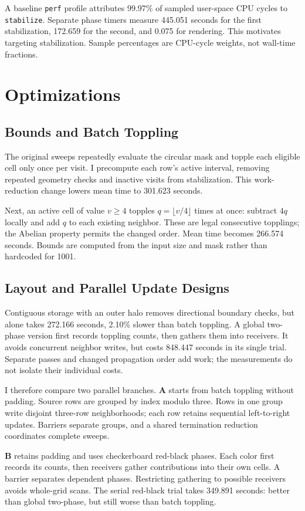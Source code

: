 \documentclass[sigplan,nonacm]{acmart}
\begin{document}
A baseline \texttt{perf} profile attributes 99.97\% of sampled user-space CPU cycles to \texttt{stabilize}. Separate phase timers measure 445.051 seconds for the first stabilization, 172.659 for the second, and 0.075 for rendering. This motivates targeting stabilization. Sample percentages are CPU-cycle weights, not wall-time fractions.

\section{Optimizations}
\subsection{Bounds and Batch Toppling}
The original sweeps repeatedly evaluate the circular mask and topple each eligible cell only once per visit. I precompute each row's active interval, removing repeated geometry checks and inactive visits from stabilization. This work-reduction change lowers mean time to 301.623 seconds.

Next, an active cell of value $v\geq4$ topples $q=\lfloor v/4\rfloor$ times at once: subtract $4q$ locally and add $q$ to each existing neighbor. These are legal consecutive topplings; the Abelian property permits the changed order. Mean time becomes 266.574 seconds. Bounds are computed from the input size and mask rather than hardcoded for 1001.

\subsection{Layout and Parallel Update Designs}
Contiguous storage with an outer halo removes directional boundary checks, but alone takes 272.166 seconds, 2.10\% slower than batch toppling. A global two-phase version first records toppling counts, then gathers them into receivers. It avoids concurrent neighbor writes, but costs 848.447 seconds in its single trial. Separate passes and changed propagation order add work; the measurements do not isolate their individual costs.

I therefore compare two parallel branches. \textbf{A} starts from batch toppling without padding. Source rows are grouped by index modulo three. Rows in one group write disjoint three-row neighborhoods; each row retains sequential left-to-right updates. Barriers separate groups, and a shared termination reduction coordinates complete sweeps.

\textbf{B} retains padding and uses checkerboard red-black phases. Each color first records its counts, then receivers gather contributions into their own cells. A barrier separates dependent phases. Restricting gathering to possible receivers avoids whole-grid scans. The serial red-black trial takes 349.891 seconds: better than global two-phase, but still worse than batch toppling.
\end{document}
